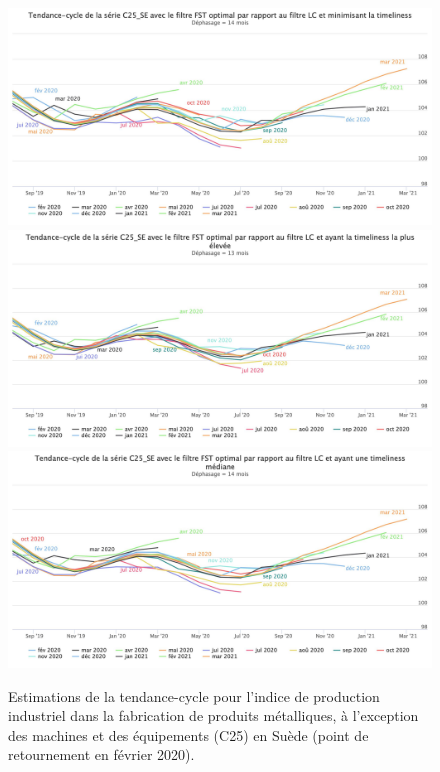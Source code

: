 \documentclass[
  11pt,
  french,
  a4paper]{article}
\newcommand\1{\mathds{1}}
\begin{document}
\begin{figure}[H]

{\centering \includegraphics[width=0.9\linewidth,]{img/simulations/c25_se_fst_lc} \includegraphics[width=0.9\linewidth,]{img/simulations/c25_se_fst_lc_min} \includegraphics[width=0.9\linewidth,]{img/simulations/c25_se_fst_lc_med} 

}

\caption[Estimations de la tendance-cycle pour l'indice de production industriel dans la fabrication de produits métalliques, à l'exception des machines et des équipements (C25) en Suède (point de retournement en février 2020)]{Estimations de la tendance-cycle pour l'indice de production industriel dans la fabrication de produits métalliques, à l'exception des machines et des équipements (C25) en Suède (point de retournement en février 2020).}\label{fig:c25sep3}

\footnotesize
\normalsize\end{figure}
\end{document}
